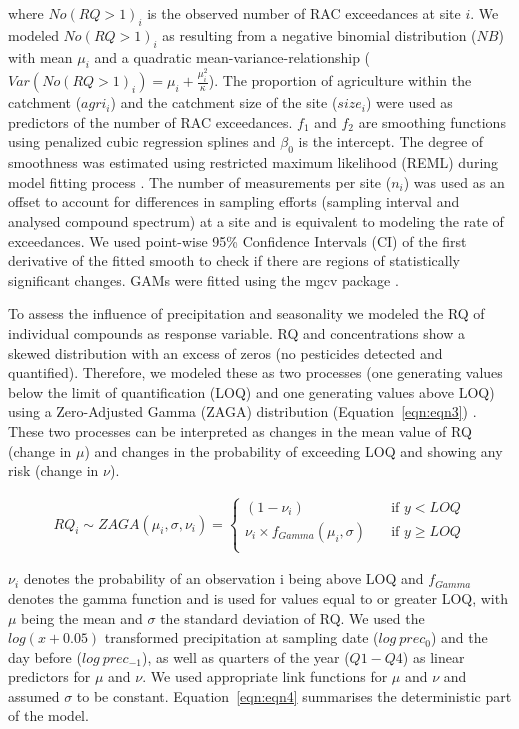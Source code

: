 \documentclass[journal=esthag,manuscript=article]{achemso}
\begin{document}
where $No(RQ > 1)_i$ is the observed number of RAC exceedances at site $i$. 
We modeled $No(RQ > 1)_i$ as resulting from a negative binomial distribution ($NB$) with mean $\mu_i$ and a quadratic mean-variance-relationship ($Var(No(RQ > 1)_i) = \mu_i + \frac{\mu_i^2}{\kappa}$).
The proportion of agriculture within the catchment ($agri_i$) and the catchment size of the site ($size_i$) were used as predictors of the number of RAC exceedances. 
$f_1$ and $f_2$ are smoothing functions using penalized cubic regression splines \citep{wood_generalized_2006} and $\beta_0$ is the intercept.
The degree of smoothness was estimated using restricted maximum likelihood (REML) during model fitting process \citep{wood_fast_2011}.
The number of measurements per site ($n_i$) was used as an offset to account for differences in sampling efforts (sampling interval and analysed compound spectrum) at a site and is equivalent to modeling the rate of exceedances. 
We used point-wise 95\% Confidence Intervals (CI) of the first derivative of the fitted smooth to check if there are regions of statistically significant changes.
GAMs were fitted using the mgcv package \citep{wood_fast_2011}.

To assess the influence of precipitation and seasonality we modeled the RQ of individual compounds as response variable.
RQ and concentrations show a skewed distribution with an excess of zeros (no pesticides detected and quantified). 
Therefore, we modeled these as two processes (one generating values below the limit of quantification (LOQ) and one generating values above LOQ) using a Zero-Adjusted Gamma (ZAGA) distribution (Equation~\ref{eqn:eqn3}) \cite{rigby_generalized_2005,stasinopoulos_gamlss.dist:_2016}.
These two processes can be interpreted as changes in the mean value of RQ (change in $\mu$) and changes in the probability of exceeding LOQ and showing any risk (change in $\nu$).

\begin{align}
RQ_i \sim ZAGA(\mu_i, \sigma, \nu_i) = 
  \begin{cases}
    (1 - \nu_i)   & \quad  \text{if } y < LOQ \\
    \nu_i \times f_{Gamma} (\mu_i, \sigma) & \quad \text{if } y \ge LOQ \\
  \end{cases}
  \label{eqn:eqn3}
\end{align}

$\nu_i$ denotes the probability of an observation i being above LOQ and $f_{Gamma}$ denotes the gamma function and is used for values equal to or greater LOQ, with $\mu$ being the mean and $\sigma$ the standard deviation of RQ.
We used the $log(x+0.05)$ transformed precipitation at sampling date ($log~prec_0$) and the day before ($log~prec_{-1}$), as well as quarters of the year ($Q1-Q4$) as linear predictors for $\mu$ and $\nu$. 
We used appropriate link functions for $\mu$ and $\nu$ and assumed $\sigma$ to be constant. 
Equation~\ref{eqn:eqn4} summarises the deterministic part of the model.
\end{document}
